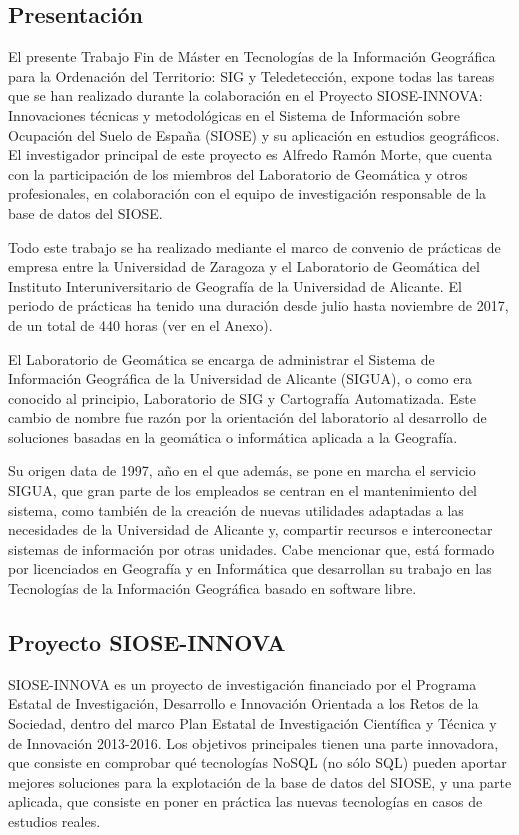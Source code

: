 
\begin{prologo}

\subsection*{Presentación}
El presente Trabajo Fin de Máster en Tecnologías de la Información Geográfica para la Ordenación del Territorio: SIG y Teledetección, expone todas las tareas que se han realizado durante la colaboración en el Proyecto SIOSE-INNOVA: Innovaciones técnicas y metodológicas en el Sistema de Información sobre Ocupación del Suelo de España (SIOSE) y su aplicación en estudios geográficos. El investigador principal de este proyecto es Alfredo Ramón Morte, que cuenta con la participación de los miembros del Laboratorio de Geomática y otros profesionales, en colaboración con el equipo de investigación responsable de la base de datos del SIOSE.

Todo este trabajo se ha realizado mediante el marco de convenio de prácticas de empresa entre la Universidad de Zaragoza y el Laboratorio de Geomática del Instituto Interuniversitario de Geografía de la Universidad de Alicante. El periodo de prácticas ha tenido una duración desde julio hasta noviembre de 2017, de un total de 440 horas (ver en el Anexo).

El Laboratorio de Geomática se encarga de administrar el Sistema de Información Geográfica de la Universidad de Alicante (SIGUA), o como era conocido al principio, Laboratorio de SIG y Cartografía Automatizada. Este cambio de nombre fue razón por la orientación del laboratorio al desarrollo de soluciones basadas en la geomática o informática aplicada a la Geografía.

Su origen data de 1997, año en el que además, se pone en marcha el servicio SIGUA, que gran parte de los empleados se centran en el mantenimiento del sistema, como también de la creación de nuevas utilidades adaptadas a las necesidades de la Universidad de Alicante y, compartir recursos e interconectar sistemas de información por otras unidades. Cabe mencionar que, está formado por licenciados en Geografía y en Informática que desarrollan su trabajo en las Tecnologías de la Información Geográfica basado en software libre.

\subsection*{Proyecto SIOSE-INNOVA}
SIOSE-INNOVA es un proyecto de investigación financiado por el Programa Estatal de Investigación, Desarrollo e Innovación Orientada a los Retos de la Sociedad, dentro del marco Plan Estatal de Investigación Científica y Técnica y de Innovación 2013-2016. Los objetivos principales tienen una parte innovadora, que consiste en comprobar qué tecnologías NoSQL (no sólo SQL) pueden aportar mejores soluciones para la explotación de la base de datos del SIOSE, y una parte aplicada, que consiste en poner en práctica las nuevas tecnologías en casos de estudios reales.


\end{prologo}
